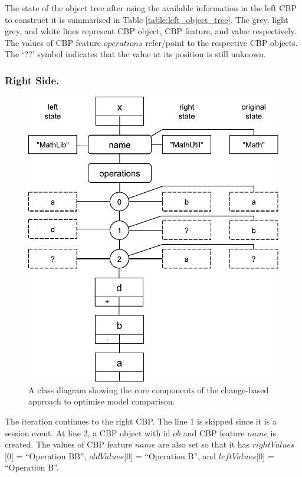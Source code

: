 \documentclass{llncs}
\begin{document}
The state of the object tree after using the available information in the left CBP to construct it is summarised in Table \ref{table:left_object_tree}. The grey, light grey, and white lines represent CBP object, CBP feature, and value respectively. The values of CBP feature $operations$ refer/point to the respective CBP objects. The `??' symbol indicates that the value at its position is still unknown.

\subsubsection{Right Side.} 
\label{sec:right_side}

\begin{figure}
    \vspace{-20pt}
    \includegraphics[width=\linewidth]{images/RightElementTreeDiagram}
    \caption{A class diagram showing the core components of the change-based approach to optimise model comparison.}
    \label{fig:right_element_tree_diagram}
\end{figure}

The iteration continues to the right CBP. The line 1 is skipped since it is a session event.  At line 2, a CBP object with id $ob$ and CBP feature $name$ is created. The values of CBP feature $name$ are also set so that it has $rightValues$[0] = ``Operation BB'', $oldValues$[0] = ``Operation B'', and $leftValues$[0] = ``Operation B''. 
\end{document}
